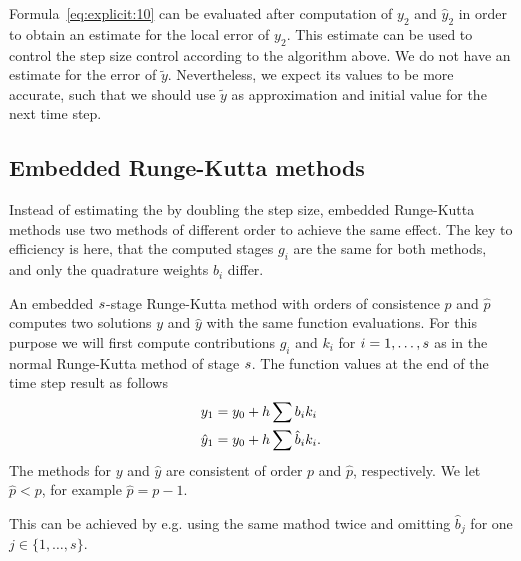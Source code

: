 \begin{remark}
  Formula~\eqref{eq:explicit:10} can be evaluated after computation of
  $y_2$ and $\hat y_2$ in order to obtain an estimate for the local
  error of $y_2$. This estimate can be used to control the step size
  control according to the algorithm above. We do not have an
  estimate for the error of $\tilde y$. Nevertheless, we expect its
  values to be more accurate, such that we should use $\tilde y$ as
  approximation and initial value for the next time step.
\end{remark}

\subsection{Embedded Runge-Kutta methods}
Instead of estimating the  by doubling the step size,
embedded Runge-Kutta methods use two methods of different order to
achieve the same effect. The key to efficiency is here, that the
computed stages $g_i$ are the same for both methods, and only the
quadrature weights $b_i$ differ.

\begin{definition}
   An embedded $s$-stage
  Runge-Kutta method with orders of consistence $p$ and $\hat p$
  computes two solutions $y$ and $\hat y$ with the same function
  evaluations. For this purpose we will first compute contributions
  $g_i$ and $k_i$ for $i=1,\dots,s$ as in the normal Runge-Kutta
  method of stage $s$. The function values at the end of the time
  step result as follows
  \begin{gather}
    \begin{split}
      y_1 &= y_0 + h \sum b_i k_i \\
      \hat y_1 &= y_0 + h \sum \hat {b}_i k_i.
    \end{split}
  \end{gather}
  The methods for $y$ and $\hat y$ are consistent of order $p$ and
  $\hat p$, respectively. We let $\hat p < p$, for example
  $\hat p = p-1$. 
  
  This can be achieved by e.g. using the same mathod twice and omitting
  $\hat{b}_j$ for one $j \in \{1, \dots, s\}$.
\end{definition}

